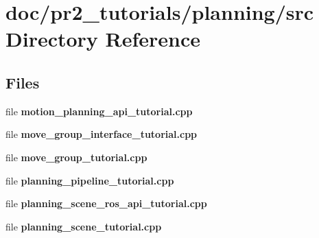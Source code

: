 \section{doc/pr2\-\_\-tutorials/planning/src Directory Reference}
\label{dir_2a2f556434f0131819e1ae1eb238ac17}
\subsection*{Files}
\begin{DoxyCompactItemize}
\item 
file {\bfseries motion\-\_\-planning\-\_\-api\-\_\-tutorial.\-cpp}
\item 
file {\bfseries move\-\_\-group\-\_\-interface\-\_\-tutorial.\-cpp}
\item 
file {\bfseries move\-\_\-group\-\_\-tutorial.\-cpp}
\item 
file {\bfseries planning\-\_\-pipeline\-\_\-tutorial.\-cpp}
\item 
file {\bfseries planning\-\_\-scene\-\_\-ros\-\_\-api\-\_\-tutorial.\-cpp}
\item 
file {\bfseries planning\-\_\-scene\-\_\-tutorial.\-cpp}
\end{DoxyCompactItemize}
